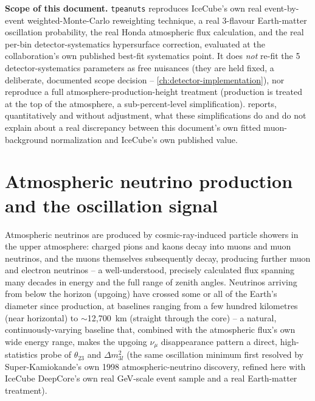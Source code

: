\begin{notebox}
\textbf{Scope of this document.} \texttt{tpeanuts} reproduces IceCube's own
real event-by-event weighted-Monte-Carlo reweighting technique, a real
3-flavour Earth-matter oscillation probability, the real Honda atmospheric
flux calculation, and the real per-bin detector-systematics hypersurface
correction, evaluated at the collaboration's own published best-fit
systematics point. It does \emph{not} re-fit the 5 detector-systematics
parameters as free nuisances (they are held fixed, a deliberate,
documented scope decision -- \cref{ch:detector-implementation}), nor
reproduce a full atmosphere-production-height treatment (production is
treated at the top of the atmosphere, a sub-percent-level simplification).
 reports, quantitatively and without adjustment, what
these simplifications do and do not explain about a real discrepancy
between this document's own fitted muon-background normalization and
IceCube's own published value.
\end{notebox}

\section{Atmospheric neutrino production and the oscillation signal}

\begin{theorybox}
Atmospheric neutrinos are produced by cosmic-ray-induced particle showers
in the upper atmosphere: charged pions and kaons decay into muons and muon
neutrinos, and the muons themselves subsequently decay, producing further
muon and electron neutrinos -- a well-understood, precisely calculated
flux \parencite{Honda2015Flux} spanning many decades in energy and the
full range of zenith angles. Neutrinos arriving from below the horizon
(upgoing) have crossed some or all of the Earth's diameter since
production, at baselines ranging from a few hundred kilometres (near
horizontal) to $\sim$12{,}700~km (straight through the core) -- a natural,
continuously-varying baseline that, combined with the atmospheric flux's
own wide energy range, makes the upgoing $\nu_\mu$ disappearance pattern a
direct, high-statistics probe of $\theta_{23}$ and $\Delta m^2_{3l}$ (the
same oscillation minimum first resolved by Super-Kamiokande's own 1998
atmospheric-neutrino discovery, refined here with IceCube DeepCore's own
real GeV-scale event sample and a real Earth-matter treatment).
\end{theorybox}

